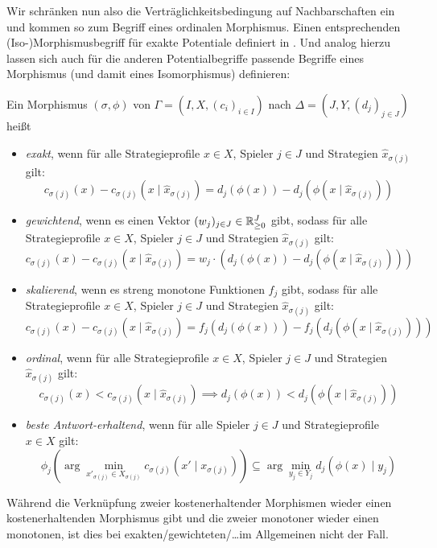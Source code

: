 
Wir schränken nun also die Verträglichkeitsbedingung auf Nachbarschaften ein und kommen so zum Begriff eines ordinalen Morphismus. Einen entsprechenden (Iso-)Morphismusbegriff für exakte Potentiale definiert \citeauthor{ReprOfFiniteGamesAsNCG} in \cite{ReprOfFiniteGamesAsNCG}. Und analog hierzu lassen sich auch für die anderen Potentialbegriffe passende Begriffe eines Morphismus (und damit eines Isomorphismus) definieren:

\begin{defn}\label{def:PotentialMorphismen}
	Ein Morphismus $(\sigma, \phi)$ von $\Gamma = (I, X, (c_i)_{i\in I})$ nach $\Delta = (J, Y, (d_j)_{j\in J})$ heißt
	\begin{itemize}
		\item \emph{exakt}, wenn für alle Strategieprofile $x \in X$, Spieler $j \in J$ und Strategien $\hat{x}_{\sigma(j)}$ gilt:
		\[c_{\sigma(j)}(x) - c_{\sigma(j)}(x \mid \hat{x}_{\sigma(j)}) = d_j(\phi(x)) - d_j(\phi(x \mid \hat{x}_{\sigma(j)}))\]
		\item \emph{gewichtend}, wenn es einen Vektor $(w_j)_{j \in J} \in \mathbb{R}_{\geq 0}^J$ gibt, sodass für alle Strategieprofile $x \in X$, Spieler $j \in J$ und Strategien $\hat{x}_{\sigma(j)}$ gilt:
		\[c_{\sigma(j)}(x) - c_{\sigma(j)}(x \mid \hat{x}_{\sigma(j)}) = w_j\cdot\left(d_j(\phi(x)) - d_j(\phi(x \mid \hat{x}_{\sigma(j)}))\right)\]
		\item \emph{skalierend}, wenn es streng monotone Funktionen $f_j$ gibt, sodass für alle Strategieprofile $x \in X$, Spieler $j \in J$ und Strategien $\hat{x}_{\sigma(j)}$ gilt:
		\[c_{\sigma(j)}(x) - c_{\sigma(j)}(x \mid \hat{x}_{\sigma(j)}) = f_j(d_j(\phi(x))) - f_j(d_j(\phi(x \mid \hat{x}_{\sigma(j)})))\]
		\item \emph{ordinal}, wenn für alle Strategieprofile $x \in X$, Spieler $j \in J$ und Strategien $\hat{x}_{\sigma(j)}$ gilt:
		\[c_{\sigma(j)}(x) < c_{\sigma(j)}(x \mid \hat{x}_{\sigma(j)}) \implies d_j(\phi(x)) < d_j(\phi(x \mid \hat{x}_{\sigma(j)}))\]
		\item \emph{beste Antwort-erhaltend}, wenn für alle Spieler $j \in J$ und Strategieprofile $x \in X$ gilt:
		\[\phi_j(\arg \min_{x'_{\sigma(j)} \in X_{\sigma(j)}}c_{\sigma(j)}(x' \mid x_{\sigma(j)})) \subseteq \arg \min_{y_j \in Y_j} d_j(\phi(x) \mid y_j)\]
	\end{itemize}	
\end{defn}

Während die Verknüpfung zweier kostenerhaltender Morphismen wieder einen kostenerhaltenden Morphismus gibt und die zweier monotoner wieder einen monotonen, ist dies bei exakten/gewichteten/\dots im Allgemeinen nicht der Fall.  

